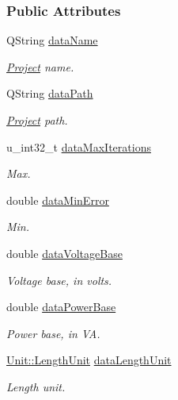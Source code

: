 \subsubsection*{Public Attributes}
\begin{DoxyCompactItemize}
\item 
Q\+String \hyperlink{class_new_project_ad0ebf4e6b19dbdf3a9ad4af27df2a8fa}{data\+Name}
\begin{DoxyCompactList}\small\item\em \hyperlink{class_project}{Project} name. \end{DoxyCompactList}\item 
Q\+String \hyperlink{class_new_project_ac684c762d3c15ff4463622978193e827}{data\+Path}
\begin{DoxyCompactList}\small\item\em \hyperlink{class_project}{Project} path. \end{DoxyCompactList}\item 
u\+\_\+int32\+\_\+t \hyperlink{class_new_project_a189825d570bc9bc35c61f7fe40de986a}{data\+Max\+Iterations}
\begin{DoxyCompactList}\small\item\em Max. \end{DoxyCompactList}\item 
double \hyperlink{class_new_project_a186c2163239625faf8c7769a72fa988c}{data\+Min\+Error}
\begin{DoxyCompactList}\small\item\em Min. \end{DoxyCompactList}\item 
double \hyperlink{class_new_project_a21dc54f9c0c8a59ca33eaa42cb9f9352}{data\+Voltage\+Base}
\begin{DoxyCompactList}\small\item\em Voltage base, in volts. \end{DoxyCompactList}\item 
double \hyperlink{class_new_project_a7a70270ca856001875a6043d5aa7a8af}{data\+Power\+Base}
\begin{DoxyCompactList}\small\item\em Power base, in V\+A. \end{DoxyCompactList}\item 
\hyperlink{class_unit_a8c8921f7b225ad6063b1cb573425b9a0}{Unit\+::\+Length\+Unit} \hyperlink{class_new_project_ac0bf8b4f04f5c9425c74dd980711f021}{data\+Length\+Unit}
\begin{DoxyCompactList}\small\item\em Length unit. \end{DoxyCompactList}\item 

\end{DoxyCompactItemize}
